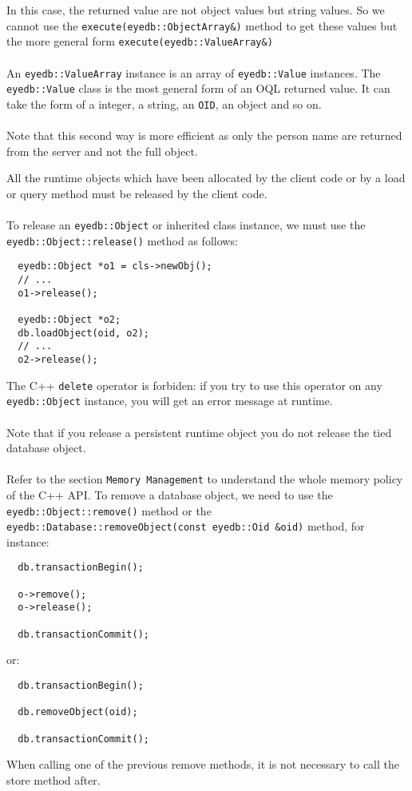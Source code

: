 \normalsize
In this case, the returned value are not object values but string values.
So we cannot use the \texttt{execute(eyedb::ObjectArray\&)} method to get
these values but the more general form \texttt{execute(eyedb::ValueArray\&)}
\\
\\
An \texttt{eyedb::ValueArray} instance is an array of \texttt{eyedb::Value} instances.
The \texttt{eyedb::Value} class is the most general form of an OQL returned value.
It can take the form of a integer, a string, an \texttt{OID}, an object and
so on.
\\
\\
Note that this second way is more efficient as only the person
name are returned from the server and not the full object.
\ee

All the runtime objects which have been allocated by the client code
or by a load or query method must be released by the client code.
\\
\\
To release an \texttt{eyedb::Object} or inherited class instance, we must use
the \texttt{eyedb::Object::release()} method as follows:
\verbsize
\begin{verbatim}
  eyedb::Object *o1 = cls->newObj();
  // ...
  o1->release();

  eyedb::Object *o2;
  db.loadObject(oid, o2);
  // ...
  o2->release();
\end{verbatim}
\normalsize
The C++ \texttt{delete} operator is forbiden: if you try to use this operator
on any \texttt{eyedb::Object} instance, you will get an error message at runtime.
\\
\\
Note that if you release a persistent runtime object you do not release
the tied database object.
\\
\\
Refer to the section \texttt{Memory Management} to understand the whole
memory policy of the C++ API.
To remove a database object, we need to use the
\texttt{eyedb::Object::remove()} method or the \texttt{eyedb::Database::removeObject(const eyedb::Oid \&oid)} method, for instance:
\verbsize
\begin{verbatim}
  db.transactionBegin();

  o->remove();
  o->release();

  db.transactionCommit();
\end{verbatim}
\normalsize
or:
\verbsize
\begin{verbatim}
  db.transactionBegin();

  db.removeObject(oid);

  db.transactionCommit();
\end{verbatim}
\normalsize
When calling one of the previous remove methods, it is not necessary
to call the store method after.

